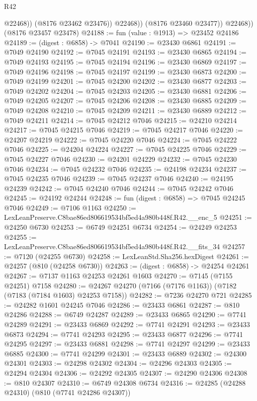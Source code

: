 \begin{lexlean}{R42}
\begin{coremodule}
{                    @22468))
                (@8176 @23462 @23476))
              @22468))
          (@8176 @23460 @23477))
        @22468))
    (@8176 @23457 @23478)
@24188 := fun (value : @1913) => @23452 @24186
@24189 := (digest : @6858) -> @7041
@24190 := @23430 @6861
@24191 := @7049 @24190
@24192 := @7045 @24191
@24193 := @23430 @6865
@24194 := @7049 @24193
@24195 := @7045 @24194
@24196 := @23430 @6869
@24197 := @7049 @24196
@24198 := @7045 @24197
@24199 := @23430 @6873
@24200 := @7049 @24199
@24201 := @7045 @24200
@24202 := @23430 @6877
@24203 := @7049 @24202
@24204 := @7045 @24203
@24205 := @23430 @6881
@24206 := @7049 @24205
@24207 := @7045 @24206
@24208 := @23430 @6885
@24209 := @7049 @24208
@24210 := @7045 @24209
@24211 := @23430 @6889
@24212 := @7049 @24211
@24214 := @7045 @24212 @7046
@24215 := @24210 @24214
@24217 := @7045 @24215 @7046
@24219 := @7045 @24217 @7046
@24220 := @24207 @24219
@24222 := @7045 @24220 @7046
@24224 := @7045 @24222 @7046
@24225 := @24204 @24224
@24227 := @7045 @24225 @7046
@24229 := @7045 @24227 @7046
@24230 := @24201 @24229
@24232 := @7045 @24230 @7046
@24234 := @7045 @24232 @7046
@24235 := @24198 @24234
@24237 := @7045 @24235 @7046
@24239 := @7045 @24237 @7046
@24240 := @24195 @24239
@24242 := @7045 @24240 @7046
@24244 := @7045 @24242 @7046
@24245 := @24192 @24244
@24248 := fun (digest : @6858) => @7045 @24245 @7046
@24249 := @7106 @1163
@24250 := LexLeanPreserve.C8bae86ed806619534bf5ed4a980b448f.R42.__enc_5
@24251 := @24250 @6730
@24253 := @6749 @24251 @6734
@24254 := @24249 @24253
@24255 := LexLeanPreserve.C8bae86ed806619534bf5ed4a980b448f.R42.__fits_34
@24257 := @7120 (@24255 @6730)
@24258 := LexLeanStd.Sha256.hexDigest
@24261 := @24257 (@810 (@24258 @6730))
@24263 := (digest : @6858) -> @24254 @24261
@24267 := @7137 @1163 @24253 @24261 @1603
@24270 := @7145 (@7155 @24251) @7158
@24280 := @24267 @24270 (@7166 (@7176 @1163)) (@7182 (@7183 (@7184 @1603) @24253 @7158))
@24282 := @7236 @24270 @721
@24285 := @24282 @1601 @24245 @7046
@24286 := @23433 @6861
@24287 := @810 @24286
@24288 := @6749 @24287
@24289 := @23433 @6865
@24290 := @7741 @24289
@24291 := @23433 @6869
@24292 := @7741 @24291
@24293 := @23433 @6873
@24294 := @7741 @24293
@24295 := @23433 @6877
@24296 := @7741 @24295
@24297 := @23433 @6881
@24298 := @7741 @24297
@24299 := @23433 @6885
@24300 := @7741 @24299
@24301 := @23433 @6889
@24302 := @24300 @24301
@24303 := @24298 @24302
@24304 := @24296 @24303
@24305 := @24294 @24304
@24306 := @24292 @24305
@24307 := @24290 @24306
@24308 := @810 @24307
@24310 := @6749 @24308 @6734
@24316 := @24285 (@24288 @24310) (@810 (@7741 @24286 @24307))
}
\end{coremodule}
\end{lexlean}
